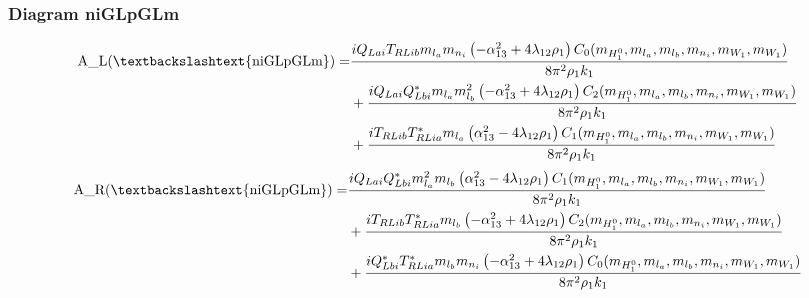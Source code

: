 \documentclass{article}
\begin{document}
\subsubsection{Diagram niGLpGLm}
\begin{align*}
\mathtt{\text{A\_L(\textbackslashtext\{niGLpGLm\})}} = & \frac{i Q_{Lai} T_{RLib} m_{l_a} m_{n_i} \left(- \alpha_{13}^{2} + 4 \lambda_{12} \rho_{1}\right) C_0(m_{H_1^0}, m_{l_a}, m_{l_b}, m_{n_i}, m_{W_1}, m_{W_1})}{8 \pi^{2} \rho_{1} k_{1}} \\
& + \frac{i Q_{Lai} Q_{Lbi}^* m_{l_a} m_{l_b}^{2} \left(- \alpha_{13}^{2} + 4 \lambda_{12} \rho_{1}\right) C_2(m_{H_1^0}, m_{l_a}, m_{l_b}, m_{n_i}, m_{W_1}, m_{W_1})}{8 \pi^{2} \rho_{1} k_{1}} \\
& + \frac{i T_{RLib} T_{RLia}^* m_{l_a} \left(\alpha_{13}^{2} - 4 \lambda_{12} \rho_{1}\right) C_1(m_{H_1^0}, m_{l_a}, m_{l_b}, m_{n_i}, m_{W_1}, m_{W_1})}{8 \pi^{2} \rho_{1} k_{1}} 
\end{align*}
\begin{align*}
\mathtt{\text{A\_R(\textbackslashtext\{niGLpGLm\})}} = & \frac{i Q_{Lai} Q_{Lbi}^* m_{l_a}^{2} m_{l_b} \left(\alpha_{13}^{2} - 4 \lambda_{12} \rho_{1}\right) C_1(m_{H_1^0}, m_{l_a}, m_{l_b}, m_{n_i}, m_{W_1}, m_{W_1})}{8 \pi^{2} \rho_{1} k_{1}} \\
& + \frac{i T_{RLib} T_{RLia}^* m_{l_b} \left(- \alpha_{13}^{2} + 4 \lambda_{12} \rho_{1}\right) C_2(m_{H_1^0}, m_{l_a}, m_{l_b}, m_{n_i}, m_{W_1}, m_{W_1})}{8 \pi^{2} \rho_{1} k_{1}} \\
& + \frac{i Q_{Lbi}^* T_{RLia}^* m_{l_b} m_{n_i} \left(- \alpha_{13}^{2} + 4 \lambda_{12} \rho_{1}\right) C_0(m_{H_1^0}, m_{l_a}, m_{l_b}, m_{n_i}, m_{W_1}, m_{W_1})}{8 \pi^{2} \rho_{1} k_{1}} 
\end{align*}
\end{document}
